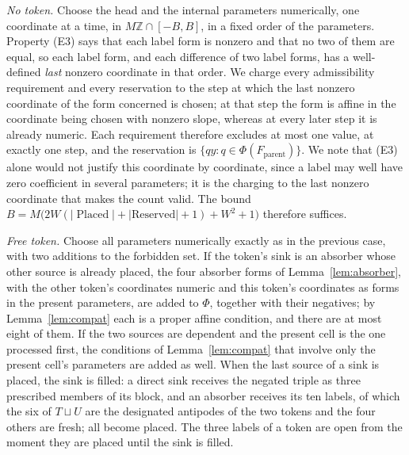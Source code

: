 \documentclass[11pt,a4paper]{article}
\theoremstyle{plain}
\theoremstyle{definition}
\theoremstyle{remark}
\newcommand{\Z}{\mathbb{Z}}
\DeclareMathOperator{\Placed}{Placed}
\begin{document}
\emph{No token.}  Choose the head and the internal parameters numerically,
one coordinate at a time, in $M\Z\cap[-B,B]$, in a fixed order of the
parameters.  Property (E3) says that each label form is nonzero and that no two
of them are equal, so each label form, and each difference of two label forms,
has a well-defined \emph{last} nonzero coordinate in that order.  We charge
every admissibility requirement and every reservation to the step at which the
last nonzero coordinate of the form concerned is chosen; at that step the form
is affine in the coordinate being chosen with nonzero slope, whereas at every
later step it is already numeric.  Each requirement therefore excludes at most
one value, at exactly one step, and the reservation is
$\{q y: q\in\Phi(F_{\mathrm{parent}})\}$.  We note that (E3) alone would not
justify this coordinate by coordinate, since a label may well have zero
coefficient in several parameters; it is the charging to the last nonzero
coordinate that makes the count valid.  The bound
$B=M\bigl(2W(|\Placed|+|\mathrm{Reserved}|+1)+W^2+1\bigr)$ therefore suffices.

\emph{Free token.}  Choose all parameters numerically exactly as in the
previous case, with two additions to the forbidden set.  If the token's sink
is an absorber whose other source is already placed, the four absorber forms
of Lemma~\ref{lem:absorber}, with the other token's coordinates numeric and
this token's coordinates as forms in the present parameters, are added to
$\Phi$, together with their negatives; by Lemma~\ref{lem:compat} each is a
proper affine condition, and there are at most eight of them.  If the two
sources are dependent and the present cell is the one processed first, the
conditions of Lemma~\ref{lem:compat} that involve only the present cell's
parameters are added as well.  When the last source of a sink is placed, the
sink is filled: a direct sink receives the negated triple as three prescribed
members of its block, and an absorber receives its ten labels, of which the
six of $T\sqcup U$ are the designated antipodes of the two tokens and the four
others are fresh; all become placed.  The three labels of a token are open
from the moment they are placed until the sink is filled.
\end{document}

